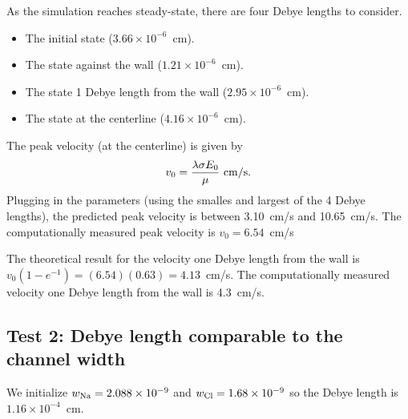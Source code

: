 \documentclass[final]{siamltex}
\begin{document}
As the simulation reaches
steady-state, there are four Debye lengths to consider.
\begin{itemize}
\item The initial state ($3.66\times 10^{-6}$~cm).
\item The state against the wall ($1.21\times 10^{-6}$~cm).
\item The state 1 Debye length from the wall ($2.95\times 10^{-6}$~cm).
\item The state at the centerline ($4.16\times 10^{-6}$~cm).
\end{itemize}
The peak velocity (at the centerline) is given by
\begin{equation}
v_0 = \frac{\lambda\sigma E_0}{\mu} ~ {\rm cm/s}.
\end{equation}
Plugging in the parameters (using the smalles and largest of the 4 Debye lengths),
the predicted peak velocity is between 
3.10~cm/s and 10.65~cm/s.  The computationally measured peak velocity 
is $v_0 = 6.54$~cm/s

The theoretical result for the velocity one Debye length from the wall
is $v_0 (1-e^{-1}) = (6.54)(0.63) = 4.13$~cm/s.
The computationally measured velocity one Debye length from the wall is 4.3~cm/s.  



\subsection{Test 2: Debye length comparable to the channel width}
We initialize $w_{\rm Na} = 2.088\times 10^{-9}$ and
$w_{\rm Cl} = 1.68\times 10^{-9}$ so the Debye length is
$1.16\times 10^{-4}$~cm.



\end{document}
